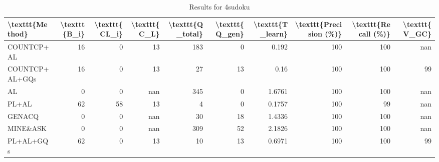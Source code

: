 \begin{table}[ht]
\caption{Results for 4sudoku}
\begin{tabular}{lrrrrrrrrr}
\hline
 \textbackslash{}texttt\{Method\}   &   \textbackslash{}texttt\{B\_i\} &   \textbackslash{}texttt\{CL\_i\} &   \textbackslash{}texttt\{C\_L\} &   \textbackslash{}texttt\{Q\_total\} &   \textbackslash{}texttt\{Q\_gen\} &   \textbackslash{}texttt\{T\_learn\} &   \textbackslash{}texttt\{Precision (\%)\} &   \textbackslash{}texttt\{Recall (\%)\} &   \textbackslash{}texttt\{V\_GC\} \\
\hline
 COUNTCP+AL        &             16 &               0 &             13 &                183 &                0 &             0.192  &                      100 &                   100 &             nan \\
 COUNTCP+AL+GQs    &             16 &               0 &             13 &                 27 &               13 &             0.16   &                      100 &                   100 &              99 \\
 AL                &              0 &               0 &            nan &                345 &                0 &             1.6761 &                      100 &                   100 &             nan \\
 PL+AL             &             62 &              58 &             13 &                  4 &                0 &             0.1757 &                      100 &                    99 &             nan \\
 GENACQ            &              0 &               0 &            nan &                 30 &               18 &             1.4336 &                      100 &                   100 &             nan \\
 MINE\&ASK          &              0 &               0 &            nan &                309 &               52 &             2.1826 &                      100 &                   100 &             nan \\
 PL+AL+GQs         &             62 &               0 &             13 &                 10 &               13 &             0.6971 &                      100 &                   100 &              99 \\
\hline
\end{tabular}
\end{table}